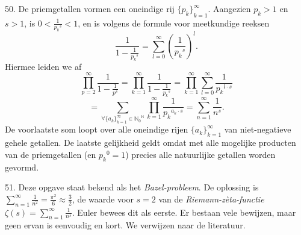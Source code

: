 \begin{problem}{50.}
    De priemgetallen vormen een oneindige rij ${\{p_k\}}_{k=1}^{\infty}$. Aangezien $p_k > 1$ en $s > 1$, is $0 < \frac{1}{{p_k}^s} < 1$, en is volgens de formule voor meetkundige reeksen
    \begin{equation*}
        \frac{1}{1 - \frac{1}{{p_k}^s}} = \textstyle\sum\limits_{l=0}^{\infty} {\left( \frac{1}{{p_k}^s} \right)}^l.
    \end{equation*}
    Hiermee leiden we af
    \begin{equation*}
        \textstyle\prod\limits_{p=2}^{\infty} \frac{1}{1 - \frac{1}{p^s}} = \textstyle\prod\limits_{k=1}^{\infty} \frac{1}{1 - \frac{1}{{p_k}^s}} = \textstyle\prod\limits_{k=1}^{\infty} \textstyle\sum\limits_{l=0}^{\infty} \frac{1}{{p_k}^{l \cdot s}}
    \end{equation*}
    \begin{equation*}
        = \textstyle\sum\limits_{\forall {\{a_k\}}_{k=1}^{\infty} \in {\mathbb{N}_0}^\mathbb{N}} \textstyle\prod\limits_{k=1}^{\infty} \frac{1}{{p_k}^{a_k \cdot s}} = \textstyle\sum\limits_{n=1}^{\infty} \frac{1}{n^s}.
    \end{equation*}
    De voorlaatste som loopt over alle oneindige rijen ${\{a_k\}}_{k=1}^{\infty}$ van niet-negatieve gehele getallen. De laatste gelijkheid geldt omdat met alle mogelijke producten van de priemgetallen (en ${p_{k}}^0 = 1$) precies alle natuurlijke getallen worden gevormd.
\end{problem}

\begin{problem}{51.}
    Deze opgave staat bekend als het \textit{Bazel-probleem}. De oplossing is $\sum\limits_{n=1}^{\infty} \frac{1}{n^2} = \frac{\pi^2}{6} \approx \frac{3}{2}$, de waarde voor $s = 2$ van de \textit{Riemann-zèta-functie} $\zeta (s) = \sum\limits_{n=1}^{\infty} \frac{1}{n^s}$. Euler bewees dit als eerste. Er bestaan vele bewijzen, maar geen ervan is eenvoudig en kort. We verwijzen naar de literatuur.
\end{problem}

\clearpage

